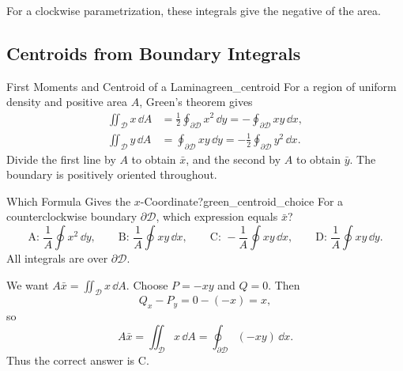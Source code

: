 \begin{center}
\end{center}

For a clockwise parametrization, these integrals give the negative of the area.

\newpage
\subsection{Centroids from Boundary Integrals}

\begin{theorem}{First Moments and Centroid of a Lamina}{green_centroid}
For a region of uniform density and positive area $A$, Green's theorem gives
\begin{align*}
    \iint_{\mathcal{D}}x\,\dd{A}
    &= \frac12\oint_{\partial\mathcal{D}}x^2\,\dd{y}
     = -\oint_{\partial\mathcal{D}}xy\,\dd{x},\\
    \iint_{\mathcal{D}}y\,\dd{A}
    &= \oint_{\partial\mathcal{D}}xy\,\dd{y}
     = -\frac12\oint_{\partial\mathcal{D}}y^2\,\dd{x}.
\end{align*}
Divide the first line by $A$ to obtain $\bar{x}$, and the second by $A$ to obtain $\bar{y}$. The boundary is positively oriented throughout.
\end{theorem}

\begin{problem}{Which Formula Gives the $x$-Coordinate?}{green_centroid_choice}
For a counterclockwise boundary $\partial\mathcal{D}$, which expression equals $\bar{x}$?
\[
    \text{A: }\frac{1}{A}\oint x^2\,\dd{y},\qquad
    \text{B: }\frac{1}{A}\oint xy\,\dd{x},\qquad
    \text{C: }-\frac{1}{A}\oint xy\,\dd{x},\qquad
    \text{D: }\frac{1}{A}\oint xy\,\dd{y}.
\]
All integrals are over $\partial\mathcal{D}$.
\end{problem}
\begin{sol}
We want $A\bar{x} = \iint_{\mathcal{D}}x\,\dd{A}$. Choose $P = -xy$ and $Q = 0$. Then
\[
    Q_x - P_y = 0 - (-x) = x,
\]
so
\[
    A\bar{x} = \iint_{\mathcal{D}}x\,\dd{A}
    = \oint_{\partial\mathcal{D}}(-xy)\,\dd{x}.
\]
Thus the correct answer is $\boxed{\text{C}}$.
\end{sol}

